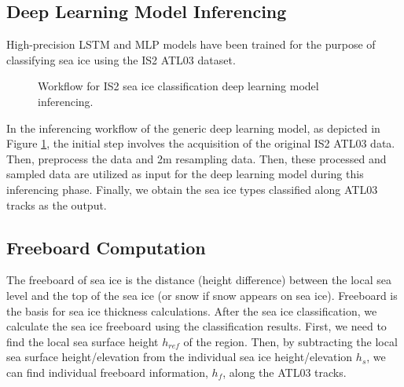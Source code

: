 \subsection{Deep Learning Model Inferencing}
High-precision LSTM and MLP models have been trained for the purpose of classifying sea ice using the IS2 ATL03 dataset.
\begin{figure}[htb]
        \centering
    \caption{Workflow for IS2 sea ice classification deep learning model inferencing.
    }
    \label{fig:is2_infer}
\end{figure}
In the inferencing workflow of the generic deep learning model, as depicted in Figure \ref{fig:is2_infer}, the initial step involves the acquisition of the original IS2 ATL03 data. Then, preprocess the data and 2m resampling data. Then, these processed and sampled data are utilized as input for the deep learning model during this inferencing phase. Finally, we obtain the sea ice types classified along ATL03 tracks as the output.



\subsection{Freeboard Computation}
The freeboard of sea ice is the distance (height difference) between the local sea level and the top of the sea ice (or snow if snow appears on sea ice). Freeboard is the basis for sea ice thickness calculations. 
After the sea ice classification, we calculate the sea ice freeboard using the classification results. 
First, we need to find the local sea surface height $h_{ref}$ of the region. Then, by subtracting the local sea surface height/elevation from the individual sea ice height/elevation $h_s$, we can find individual freeboard information, $h_f$, along the ATL03 tracks.

